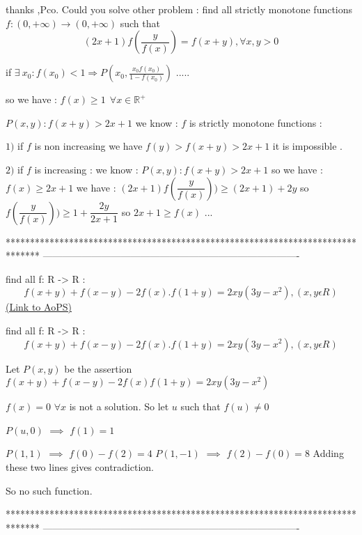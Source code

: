 \begin{solution}
	\begin{tcolorbox}thanks ,Pco. Could you solve other problem : find all strictly monotone functions $f:(0,+\infty)\to(0,+\infty)$ such that
\[(2x+1)f(\dfrac{y}{f(x)})=f(x+y),\forall x,y>0\]\end{tcolorbox}

if $\exists \: x_{0}: f(x_{0})< 1\Rightarrow P(x_{0},\frac{x_{0}f(x_{0})}{1-f(x_{0})})$ .....


so we have : $f(x)\geq 1\: \: \forall x\in \mathbb{R}^{+}$ 

$P(x,y):f(x+y)>2x+1$ we know : $f$ is strictly monotone functions :

 $1)$ if $f$ is non increasing we have $f(y)>f(x+y)>2x+1$ it is impossible .

$2)$ if $f$ is increasing : we know : $P(x,y):f(x+y)>2x+1$ so we have : $f(x)\geq 2x+1$  we have : $(2x+1)f(\dfrac{y}{f(x)}))\geq (2x+1)+2y$ so $f(\dfrac{y}{f(x)}))\geq 1+\dfrac{2y}{2x+1}$ so $2x+1\geq f(x)$ ...
\end{solution}
*******************************************************************************
-------------------------------------------------------------------------------

\begin{problem}
	find all f: R -> R :
\[ f(x+y)+f(x-y)-2f(x).f(1+y)=2xy(3y-x^{2}),(x,y\epsilon R) \]
	\flushright \href{https://artofproblemsolving.com/community/c6h594605}{(Link to AoPS)}
\end{problem}



\begin{solution}
	\begin{tcolorbox}find all f: R -> R :
\[ f(x+y)+f(x-y)-2f(x).f(1+y)=2xy(3y-x^{2}),(x,y\epsilon R) \]\end{tcolorbox}
Let $P(x,y)$ be the assertion $f(x+y)+f(x-y)-2f(x)f(1+y)=2xy(3y-x^2)$

$f(x)=0$ $\forall x$ is not a solution. So let $u$ such that $f(u)\ne 0$

$P(u,0)$ $\implies$ $f(1)=1$

$P(1,1)$ $\implies$  $f(0)-f(2)=4$
$P(1,-1)$ $\implies$ $f(2)-f(0)=8$
Adding these two lines gives contradiction.

So no such function.
\end{solution}
*******************************************************************************
-------------------------------------------------------------------------------


